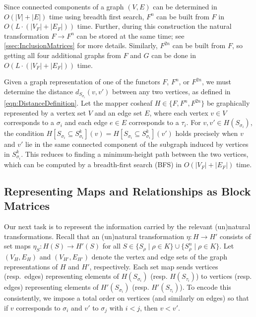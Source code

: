 Since connected components of a graph $(V,E)$ can be determined in $O(|V|+|E|)$ time using breadth first search, $F^n$ can be built from $F$ in $O(L \cdot (|V_F| + |E_F|))$ time.
Further, during this construction the natural transformation $F \rightarrow F^n$ can be stored at the same time; see \cref{ssec:InclusionMatrices} for more details. 
Similarly, $F^{2n}$ can be built from $F$, so getting all four additional graphs from $F$ and $G$ can be done in $O(L \cdot (|V_F| + |E_F|))$ time.

Given a graph representation of one of the functors $F$, $F^n$, or $F^{2n}$, we must determine the distance $d_{S_{\sigma_i}}(v,v')$ between any two vertices, as defined in \cref{eqn:DistanceDefinition}.
Let the mapper cosheaf $H \in \{F, F^n, F^{2n}\}$ be graphically represented by a vertex set $V$ and an edge set $E$, where each vertex $v \in V$ corresponds to a $\sigma_i$ and each edge $e \in E$ corresponds to a $\tau_i$.
For $v, v' \in H(S_{\sigma_i})$, the condition $H[S_{\sigma_i} \subseteq S_{\sigma_i}^k](v) = H[S_{\sigma_i} \subseteq S_{\sigma_i}^k](v')$ holds precisely when $v$ and $v'$ lie in the same connected component of the subgraph induced by vertices in $S_{\sigma_i}^k$.
This reduces to finding a minimum-height path between the two vertices, which can be computed by a breadth-first search (BFS) in $O(|V_F| + |E_F|)$ time.



\subsection{Representing Maps and Relationships as Block Matrices}
\label{sec:AllMatrices}

Our next task is to represent the information carried by the relevant (un)natural transformations. 
Recall that an (un)natural transformation $\eta\colon H \to H'$ consists of set maps $\eta_{S}\colon H(S) \to H'(S)$ for all $S \in \{S_\rho \mid \rho \in K\} \cup \{S^n_\rho \mid \rho \in K\}$. Let $(V_H, E_H)$ and $(V_{H'}, E_{H'})$ denote the vertex and edge sets of the graph representations of $H$ and $H'$, respectively. 
Each set map sends vertices (resp.~edges) representing elements of $H(S_{\sigma_i})$ (resp. $H(S_{\tau_i})$) to vertices (resp. edges) representing elements of $H'(S_{\sigma_i})$ (resp. $H'(S_{\tau_i})$). To encode this consistently, we impose a total order on vertices (and similarly on edges) so that if $v$ corresponds to $\sigma_i$ and $v'$ to $\sigma_j$ with $i < j$, then $v < v'$.

